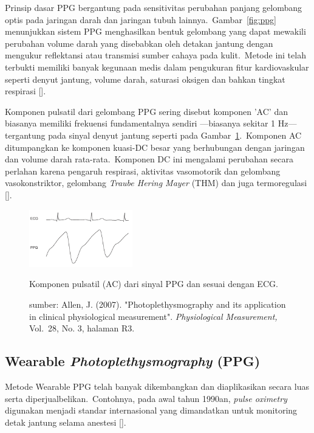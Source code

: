 Prinsip dasar PPG bergantung pada sensitivitas perubahan panjang gelombang optis pada jaringan darah dan jaringan tubuh lainnya.~Gambar~\ref{fig:ppg} menunjukkan sistem PPG menghasilkan bentuk gelombang yang dapat mewakili perubahan volume darah yang disebabkan oleh detakan jantung dengan mengukur reflektansi atau transmisi sumber cahaya pada kulit.~Metode ini telah terbukti memiliki banyak kegunaan medis dalam pengukuran fitur kardiovaskular seperti denyut jantung, volume darah, saturasi oksigen dan bahkan tingkat respirasi [\citet{Allen2007,charlton2016}].

Komponen pulsatil dari gelombang PPG sering disebut komponen 'AC' dan biasanya memiliki frekuensi fundamentalnya sendiri ---biasanya sekitar 1 Hz--- tergantung pada sinyal denyut jantung seperti pada Gambar~\ref{fig:ecg_and_ppg}.~Komponen AC ditumpangkan ke komponen kuasi-DC besar yang berhubungan dengan jaringan dan volume darah rata-rata.~Komponen DC ini mengalami perubahan secara perlahan karena pengaruh respirasi, aktivitas vasomotorik dan gelombang vasokonstriktor, gelombang \textit{Traube Hering Mayer} (THM) dan juga termoregulasi [\citet{Allen2007}].
\begin{figure}[ht]
	\centering
	\includegraphics[width=0.4\textwidth]{ecg_and_ppg}
	\caption{Komponen pulsatil (AC) dari sinyal PPG dan sesuai dengan ECG.}
	\caption*{sumber: Allen, J. (2007). "Photoplethysmography and its application in clinical physiological measurement". \textit{Physiological Measurement,} Vol.~28, No. 3, halaman R3.}
	\label{fig:ecg_and_ppg}   
\end{figure}
\subsection{Wearable \textit{Photoplethysmography} (PPG)}
Metode Wearable PPG telah banyak dikembangkan dan diaplikasikan secara luas serta diperjualbelikan.~Contohnya, pada awal tahun 1990an, \textit{pulse oximetry} digunakan menjadi standar internasional yang dimandatkan untuk monitoring detak jantung selama anestesi [\citet{tremper1989}]. 

